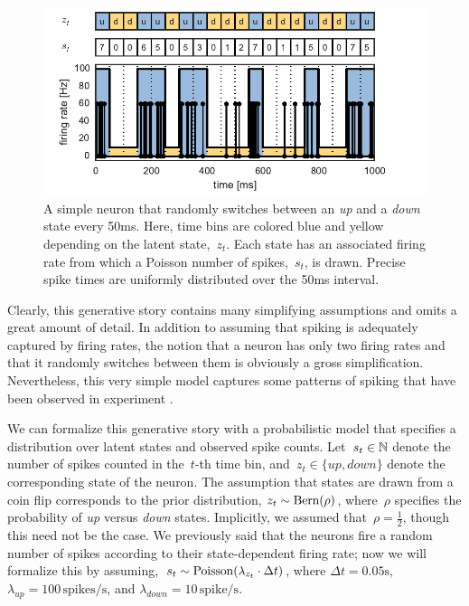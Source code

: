 \begin{figure}[t]
\centering%
\includegraphics[width=5.5in]{figures/ch1/figure1} 
\caption[Simple neuron with up and down states]{A simple neuron that
  randomly switches between an \textit{up} and a \textit{down} state
  every 50ms. Here, time bins are colored blue and yellow depending on
  the latent state,~$z_t$. Each state has an associated firing rate from
  which a Poisson number of spikes,~$s_t$, is drawn. Precise spike
  times are uniformly distributed over the 50ms interval.}
\label{fig:updown}
\vspace{-0.5cm}
\end{figure}


Clearly, this generative story contains many simplifying assumptions
and omits a great amount of detail. In addition to assuming that
spiking is adequately captured by firing rates, the notion that a
neuron has only two firing rates and that it randomly switches between
them is obviously a gross simplification. Nevertheless, this very
simple model captures some patterns of spiking that have been observed
in experiment \cite{cowan1994spontaneous, shu2003turning}. 

\sloppy We can formalize this generative story with a probabilistic
model that specifies a distribution over latent states and
observed spike counts. Let~$s_t \in \mathbb{N}$ denote the number of
spikes counted in the~$t$-th time bin,
and~$z_t \in \{\textit{up}, \textit{down}\}$ denote the corresponding
state of the neuron. The assumption that states are drawn from a coin
flip corresponds to the prior distribution,
${z_t \sim \mathrm{Bern}(\rho)}$, where~$\rho$ specifies the
probability of \textit{up} versus \textit{down} states.  Implicitly,
we assumed that~${\rho=\tfrac{1}{2}}$, though this need not be the
case.  We previously said that the neurons fire a random number of
spikes according to their state-dependent firing rate; now we will
formalize this by
assuming,~${s_{t} \sim \mathrm{Poisson}(\lambda_{z_t} \cdot \Delta t)}$,
where ${\Delta t = 0.05\text{s}}$,
${\lambda_{\textit{up}} = 100\,\text{spikes/s}}$, and
${\lambda_{\textit{down}} = 10\,\text{spike/s}}$. 

